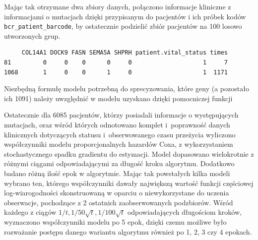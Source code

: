 Mając tak otrzymane dwa zbiory danych, połączono informacje kliniczne z informacjami o mutacjach dzięki przypisanym do
pacjentów i ich próbek kodów \texttt{bcr\_patient\_barcode}, by
ostatecznie podzielić zbiór pacjentów na 100 losowo utworzonych grup.

\begin{Shaded}
\begin{Highlighting}[]
\NormalTok{(}\NormalTok{)}
 \NormalTok{) ->}\StringTok{ }
\NormalTok{(coxData_split[[}\NormalTok{]][}\NormalTok{(}\NormalTok{,}\NormalTok{), }\NormalTok{(}\NormalTok{,}\NormalTok{,}\NormalTok{,}\NormalTok{,}\NormalTok{,}\NormalTok{:}\NormalTok{)])}
\end{Highlighting}
\end{Shaded}

\begin{verbatim}
     COL14A1 DOCK9 FASN SEMA5A SHPRH patient.vital_status times
81         0     0    0      0     0                    1     7
1068       1     0    0      1     0                    1  1171
\end{verbatim}

Niezbędną formułę modelu potrzebną do sprecyzowania, które geny (a
pozostało ich 1091) należy uwzględnić w modelu uzyskano dzięki
pomocniczej funkcji

\begin{Shaded}
\begin{Highlighting}[]
\StringTok{ }
\end{Highlighting}
\end{Shaded}

Ostatecznie dla 6085 pacjentów, którzy posiadali informacje o
występujących mutacjach, oraz wśród których odnotowano komplet i~poprawność danych klinicznych dotyczących statusu i~obserwowanego czasu
przeżycia wyliczono współczynniki modelu proporcjonalnych hazardów Coxa,
z wykorzystaniem stochastycznego spadku gradientu do estymacji. Model
dopasowano wielokrotnie z różnymi ciągami odpowiadającymi za długość
kroku algorytmu. Dodatkowo badano różną ilość epok w algorytmie. Mając tak
powstałych kilka modeli wybrano ten, którego współczynniki
dawały największą wartość funkcji częściowej log-wiarogodności skonstruowaną w oparciu o 
niewykorzystane do uczenia obserwacje, pochodzące z 2 ostatnich
zaobserwowanych podzbiorów. Wśród każdego z ciągów
\(1/t, 1/50\sqrt{t}, 1/100\sqrt{t}\) odpowiadających długościom
kroków, wyznaczono współczynniki modelu po 5 epok, dzięki
czemu możliwe było rozważanie postępu danego wariantu algorytmu również
po 1, 2, 3 czy 4 epokach.


